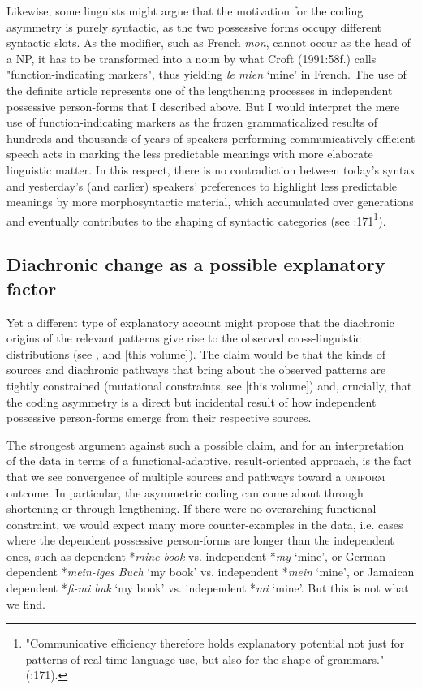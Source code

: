 \documentclass[output=paper]{langsci/langscibook}
\begin{document}
Likewise, some linguists might argue that the motivation for the coding asymmetry is purely syntactic, as the two possessive forms occupy different syntactic slots. As the modifier, such as French \textit{mon}, cannot occur as the head of a NP, it has to be transformed into a noun by what Croft (1991:58f.) calls "function-indicating markers", thus yielding \textit{le mien} `mine' in French. The use of the definite article represents one of the lengthening processes in independent possessive person-forms that I described above. But I would interpret the mere use of function-indicating markers as the frozen grammaticalized results of hundreds and thousands of years of speakers performing communicatively efficient speech acts in marking the less predictable meanings with more elaborate linguistic matter. In this respect, there is no contradiction between today's syntax and yesterday’s (and earlier) speakers' preferences to highlight less predictable meanings by more morphosyntactic material, which accumulated over generations and eventually contributes to the shaping of syntactic categories (see \citealt{NorcliffeJaeger2016}:171\footnote{"Communicative efficiency therefore holds explanatory potential not just for patterns of real-time language use, but also for the shape of grammars." (\citealt{NorcliffeJaeger2016}:171).}). 


\subsection{ Diachronic change as a possible explanatory factor}

Yet a different type of explanatory account might propose that the diachronic origins of the relevant patterns give rise to the observed cross-linguistic distributions (see \citealt{Cristofaro2017}, and \citealt{Cristofaro2018} [this volume]). The claim would be that the kinds of sources and diachronic pathways that bring about the observed patterns are tightly constrained (mutational constraints, see \citealt{Haspelmath2018} [this volume]) and, crucially, that the coding asymmetry is a direct but incidental result of how independent possessive person-forms emerge from their respective sources. 

The strongest argument against such a possible claim, and for an interpretation of the data in terms of a functional-adaptive, result-oriented approach, is the fact that we see convergence of multiple sources and pathways toward a \textsc{uniform} outcome. In particular, the asymmetric coding can come about through shortening or through lengthening. If there were no overarching functional constraint, we would expect many more counter-examples in the data, i.e. cases where the dependent possessive person-forms are longer than the independent ones, such as dependent *\textit{mine book} vs. independent *\textit{my} `mine', or German dependent *\textit{mein-iges Buch} `my book' vs. independent *\textit{mein} `mine', or Jamaican dependent *\textit{fi-mi buk} `my book' vs. independent *\textit{mi} `mine'. But this is not what we find.
\end{document}
